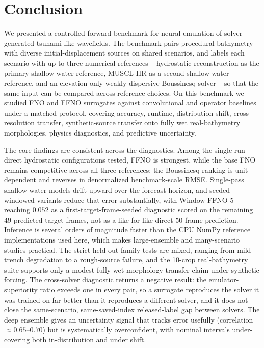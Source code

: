 \section{Conclusion}
\label{sec:conclusion}

We presented a controlled forward benchmark for neural emulation of solver-generated tsunami-like wavefields. The benchmark pairs procedural bathymetry with diverse initial-displacement sources on shared scenarios, and labels each scenario with up to three numerical references -- hydrostatic reconstruction as the primary shallow-water reference, MUSCL-HR as a second shallow-water reference, and an elevation-only weakly dispersive Boussinesq solver -- so that the same input can be compared across reference choices. On this benchmark we studied FNO and FFNO surrogates against convolutional and operator baselines under a matched protocol, covering accuracy, runtime, distribution shift, cross-resolution transfer, synthetic-source transfer onto fully wet real-bathymetry morphologies, physics diagnostics, and predictive uncertainty.

The core findings are consistent across the diagnostics. Among the single-run direct hydrostatic configurations tested, FFNO is strongest, while the base FNO remains competitive across all three references; the Boussinesq ranking is unit-dependent and reverses in denormalized benchmark-scale RMSE. Single-pass shallow-water models drift upward over the forecast horizon, and seeded windowed variants reduce that error substantially, with Window-FFNO-5 reaching $0.052$ as a first-target-frame-seeded diagnostic scored on the remaining $49$ predicted target frames, not as a like-for-like direct $50$-frame prediction. Inference is several orders of magnitude faster than the CPU NumPy reference implementations used here, which makes large-ensemble and many-scenario studies practical. The strict held-out-family tests are mixed, ranging from mild trench degradation to a rough-source failure, and the 10-crop real-bathymetry suite supports only a modest fully wet morphology-transfer claim under synthetic forcing. The cross-solver diagnostic returns a negative result: the emulator-superiority ratio exceeds one in every pair, so a surrogate reproduces the solver it was trained on far better than it reproduces a different solver, and it does not close the same-scenario, same-saved-index released-label gap between solvers. The deep ensemble gives an uncertainty signal that tracks error usefully (correlation $\approx 0.65$--$0.70$) but is systematically overconfident, with nominal intervals under-covering both in-distribution and under shift.

